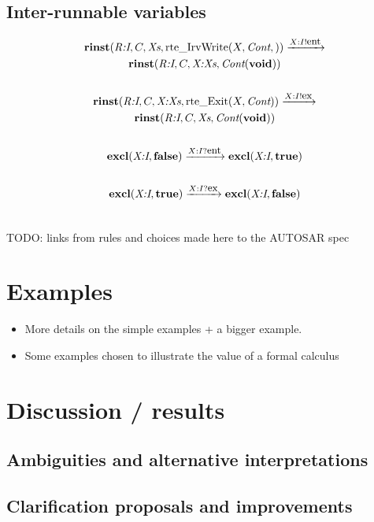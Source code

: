 \documentclass[twocolumn]{article}
\newcommand{\V}[1]{\text{\it #1}}
\newcommand{\Cont} {\V{Cont}}
\newcommand{\Xs}   {\V{Xs}}
\newcommand{\kw}[1]{\textbf{#1}}
\newcommand{\void}    {\kw{void}}
\newcommand{\true}    {\kw{true}}
\newcommand{\false}   {\kw{false}}
\newcommand{\adr}[1]{\emph{#1}}
\newcommand{\rinst}   [4]{\kw{rinst}(#1,#2,#3,#4)}
\newcommand{\excl}    [2]{\kw{excl}(#1,#2)}
\newcommand{\rte}[1]{\text{rte\_#1}}
\newcommand{\Exit}      [2]{\rte{Exit}(#1,#2)}
\newcommand{\IrvWrite}  [3]{\rte{IrvWrite}(#1,#2,#3)}
\newcommand{\red} [1]{\xrightarrow{#1}}
\newcommand{\say} [2]{#1 ! #2}
\newcommand{\hear}[2]{#1 ? #2}
\newcommand{\ent}{\text{\small ent}}
\newcommand{\ex} {\text{\small ex}}
\begin{document}
\subsection{Inter-runnable variables}

\begin{gather*}
	\rinst{\adr{R:I}}{C}{\Xs}{\IrvWrite{X}{\Cont}}  \red{\say{X:I}{\ent}}  \\
		\rinst{\adr{R:I}}{C}{\adr{X:Xs}}{\Cont(\void)} \\
	\\
	\rinst{\adr{R:I}}{C}{\adr{X:Xs}}{\Exit{X}{\Cont}}  \red{\say{X:I}{\ex}}  \\
		\rinst{\adr{R:I}}{C}{\Xs}{\Cont(\void)} \\
	\\
	\excl{\adr{X:I}}{\false} \red{\hear{X:I}{\ent}} \excl{\adr{X:I}}{\true} \\
	\\
	\excl{\adr{X:I}}{\true} \red{\hear{X:I}{\ex}} \excl{\adr{X:I}}{\false} \\
	\\
\end{gather*}


TODO: links from rules and choices made here to the AUTOSAR spec

\section{Examples}
\label{sec:Examples}

\begin{itemize}
\item More details on the simple examples + a bigger example.
\item Some examples chosen to illustrate the value of a formal calculus
\end{itemize}

\section{Discussion / results}
\label{sec:Disc}

\subsection{Ambiguities and alternative interpretations}
\label{sec:DiscAmb}

\subsection{Clarification proposals and improvements}
\label{sec:DiscImp}
\end{document}
